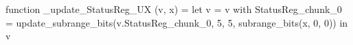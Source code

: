function _update_StatusReg_UX (v, x) = let v = { v with StatusReg_chunk_0 = update_subrange_bits(v.StatusReg_chunk_0, 5, 5, subrange_bits(x, 0, 0)) } in
  v
